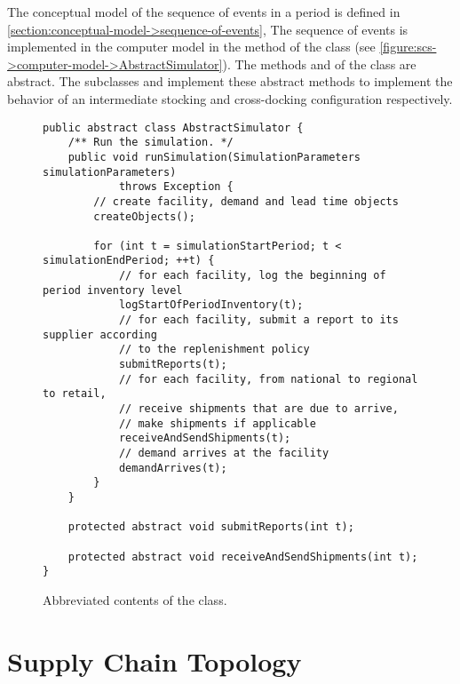 The conceptual model of the sequence of events in a period
is defined in \autoref{section:conceptual-model->sequence-of-events},
The sequence of events is implemented in the computer model
in the  method
of the class 
(see \autoref{figure:scs->computer-model->AbstractSimulator}).
The methods  and 
of the  class are abstract.
The subclasses  and 
implement these abstract methods
to implement the behavior of an
intermediate stocking and cross-docking configuration respectively.

\begin{figure}[h!]
\begin{lstlisting}
public abstract class AbstractSimulator {
    /** Run the simulation. */
    public void runSimulation(SimulationParameters simulationParameters)
            throws Exception {
        // create facility, demand and lead time objects
        createObjects();

        for (int t = simulationStartPeriod; t < simulationEndPeriod; ++t) {
            // for each facility, log the beginning of period inventory level
            logStartOfPeriodInventory(t);
            // for each facility, submit a report to its supplier according
            // to the replenishment policy
            submitReports(t);
            // for each facility, from national to regional to retail,
            // receive shipments that are due to arrive,
            // make shipments if applicable
            receiveAndSendShipments(t);
            // demand arrives at the facility
            demandArrives(t);
        }
    }

    protected abstract void submitReports(int t);

    protected abstract void receiveAndSendShipments(int t);
}
\end{lstlisting}
\caption{Abbreviated contents of the \protect{} class.}
\label{figure:scs->computer-model->AbstractSimulator}
\end{figure}





\section{Supply Chain Topology}
\label{section:scs->computer-model->supply-chain-topology}


